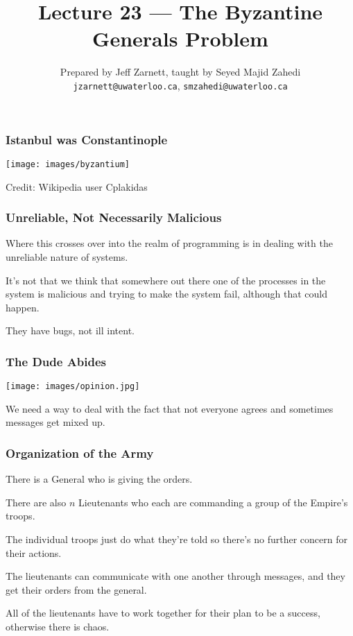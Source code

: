 

\title{Lecture 23 --- The Byzantine Generals Problem }

\author{Prepared by Jeff Zarnett, taught by Seyed Majid Zahedi \\ \small \texttt{jzarnett@uwaterloo.ca}, \texttt{smzahedi@uwaterloo.ca}}

\date{}




\begin{frame}
	\titlepage

\end{frame}


\begin{frame}
	\frametitle{Istanbul was Constantinople}

	\begin{center}
		\texttt{[image: images/byzantium]}
	\end{center}

	Credit: Wikipedia user Cplakidas


\end{frame}

\begin{frame}
	\frametitle{Unreliable, Not Necessarily Malicious}

	Where this crosses over into the realm of programming is in dealing with the unreliable nature of systems.

	It's not that we think that somewhere out there one of the processes in the system is malicious and trying to make the system fail, although that could happen.

	They have bugs, not ill intent.
\end{frame}


\begin{frame}
	\frametitle{The Dude Abides}
	\begin{center}
		\texttt{[image: images/opinion.jpg]}
	\end{center}

	We need a way to deal with the fact that not everyone agrees and sometimes messages get mixed up.

\end{frame}

\begin{frame}
	\frametitle{Organization of the Army}

	There is a \alert{General} who is giving the orders.

	There are also $n$ \alert{Lieutenants} who each are commanding a group of the Empire's troops.

	The individual troops just do what they're told so there's no further concern for their actions.

	The lieutenants can communicate with one another through messages, and they get their orders from the general.

	All of the lieutenants have to work together for their plan to be a success, otherwise there is chaos.
\end{frame}


